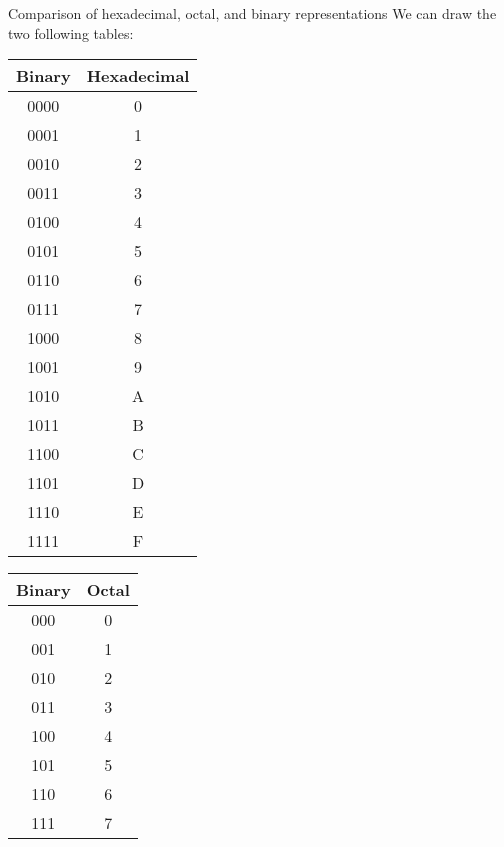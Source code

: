 \documentclass[a4paper]{article}
\begin{document}
\begin{parag}{Comparison of hexadecimal, octal, and binary representations}
    We can draw the two following tables:

    \begin{center}
    \begin{tabular}{|c|c|}
        \hline
        Binary & Hexadecimal \\
        \hline
        0000 & 0 \\
        \hline
        0001 & 1 \\
        \hline
        0010 & 2 \\
        \hline
        0011 & 3 \\
        \hline
        0100 & 4 \\
        \hline
        0101 & 5 \\
        \hline
        0110 & 6 \\
        \hline
        0111 & 7 \\
        \hline
        1000 & 8 \\
        \hline
        1001 & 9 \\
        \hline
        1010 & A \\
        \hline
        1011 & B \\
        \hline
        1100 & C \\
        \hline
        1101 & D \\
        \hline
        1110 & E \\
        \hline
        1111 & F  \\
        \hline
    \end{tabular}
    \hspace{3em}
    \begin{tabular}{|c|c|}
        \hline
        Binary & Octal \\
        \hline
        000 & 0 \\
        \hline
        001 & 1 \\
        \hline
        010 & 2 \\
        \hline
        011 & 3 \\
        \hline
        100 & 4 \\
        \hline
        101 & 5 \\
        \hline
        110 & 6 \\
        \hline
        111 & 7 \\
        \hline
    \end{tabular}
    \end{center}
    

\end{parag}
\end{document}
